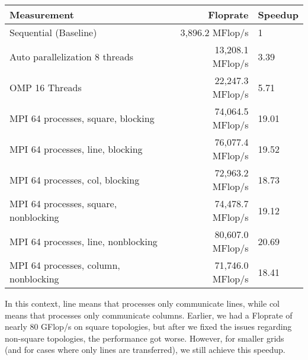 \begin{center}

  \begin{tabular} {|l|r|l|}
    \hline
    Measurement & Floprate & Speedup \\ \hline
    Sequential (Baseline) & 3,896.2 MFlop/s & 1 \\ \hline
    Auto parallelization 8 threads & 13,208.1 MFlop/s & 3.39 \\ \hline
    OMP 16 Threads  & 22,247.3 MFlop/s & 5.71\\ \hline
    MPI 64 processes, square, blocking  & 74,064.5 MFlop/s & 19.01\\ \hline
    MPI 64 processes, line, blocking  & 76,077.4 MFlop/s & 19.52\\ \hline
    MPI 64 processes, col, blocking  & 72,963.2 MFlop/s & 18.73\\ \hline
    MPI 64 processes, square, nonblocking  & 74,478.7 MFlop/s & 19.12\\ \hline
    MPI 64 processes, line, nonblocking  & 80,607.0 MFlop/s & 20.69\\ \hline
    MPI 64 processes, column, nonblocking  & 71,746.0 MFlop/s & 18.41\\ \hline
    

    

    
  \end{tabular}

\end{center}
In this context, line means that processes only communicate lines, while col means that processes only communicate columns. Earlier, we had a Floprate of nearly 80 GFlop/s on square topologies, but after we fixed the issues regarding non-square topologies, the performance got worse. However, for smaller grids (and for cases where only lines are transferred), we still achieve this speedup.
